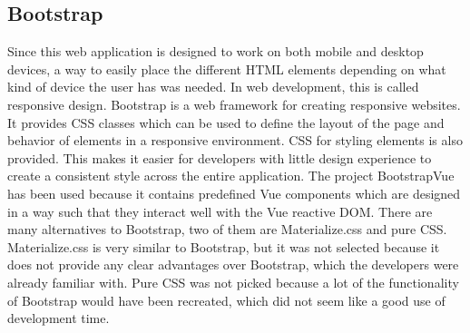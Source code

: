 \subsection{Bootstrap}
Since this web application is designed to work on both mobile and desktop devices, a way to easily place the different HTML elements depending on what kind of device the user has was needed. In web development, this is called responsive design. Bootstrap\cite{Bootstrap:Info} is a web framework for creating responsive websites. It provides CSS classes which can be used to define the layout of the page and behavior of elements in a responsive environment. CSS for styling elements is also provided. This makes it easier for developers with little design experience to create a consistent style across the entire application. The project BootstrapVue\cite{BootstrapVue:Info} has been used because it contains predefined Vue components which are designed in a way such that they interact well with the Vue reactive DOM. There are many alternatives to Bootstrap, two of them are Materialize.css and pure CSS. Materialize.css is very similar to Bootstrap, but it was not selected because it does not provide any clear advantages over Bootstrap, which the developers were already familiar with. Pure CSS was not picked because a lot of the functionality of Bootstrap would have been recreated, which did not seem like a good use of development time.